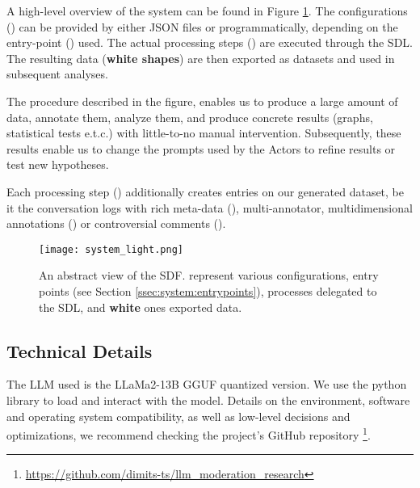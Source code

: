 A high-level overview of the system can be found in Figure \ref{fig::system}. The configurations () can be provided by either \ac{JSON} files or programmatically, depending on the entry-point () used. The actual processing steps () are executed through the \ac{SDL}. The resulting data (\textbf{white shapes}) are then exported as datasets and used in subsequent analyses.

The procedure described in the figure, enables us to produce a large amount of data, annotate them, analyze them, and produce concrete results (graphs, statistical tests e.t.c.) with little-to-no manual intervention. Subsequently, these results enable us to change the prompts used by the Actors to refine results or test new hypotheses.

Each processing step () additionally creates entries on our generated dataset, be it the conversation logs with rich meta-data (), multi-annotator, multidimensional annotations () or controversial comments ().

\begin{figure}
	\centering
	\texttt{[image: system\_light.png]}
	\caption{An abstract view of the \ac{SDF}.  represent various configurations,  entry points (see Section \ref{ssec:system:entrypoints}),  processes delegated to the \ac{SDL}, and \textbf{white} ones exported data.}
	\label{fig::system}
\end{figure}



\subsection{Technical Details}
\label{ssec:system:details}

The LLM used is the LLaMa2-13B GGUF quantized version. We use the  python library to load and interact with the model. Details on the environment, software and operating system compatibility, as well as low-level decisions and optimizations, we recommend checking the project's GitHub repository \footnote{\url{https://github.com/dimits-ts/llm_moderation_research}}.

